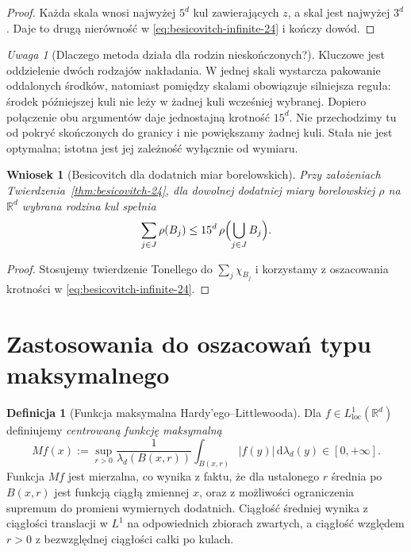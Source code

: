 \documentclass[11pt,a4paper,oneside]{book}
\numberwithin{equation}{chapter}
\theoremstyle{plain}
\newtheorem{wniosek}[twierdzenie]{Wniosek}
\theoremstyle{definition}
\newtheorem{definicja}[twierdzenie]{Definicja}
\theoremstyle{remark}
\newtheorem{uwaga}[twierdzenie]{Uwaga}
\begin{document}
\begin{proof}
Każda skala wnosi najwyżej $5^d$ kul
zawierających $z$, a skal jest najwyżej $3^d$.
Daje to drugą nierówność w
\eqref{eq:besicovitch-infinite-24} i kończy dowód.
\end{proof}

\begin{uwaga}[Dlaczego metoda działa dla rodzin nieskończonych?]
Kluczowe jest oddzielenie dwóch rodzajów nakładania.
W jednej skali wystarcza pakowanie oddalonych
środków, natomiast pomiędzy skalami obowiązuje
silniejsza reguła: środek późniejszej kuli nie leży
w żadnej kuli wcześniej wybranej. Dopiero
połączenie obu argumentów daje jednostajną
krotność $15^d$. Nie przechodzimy tu od pokryć
skończonych do granicy i nie powiększamy żadnej kuli.
Stała nie jest optymalna; istotna jest jej
zależność wyłącznie od wymiaru.
\end{uwaga}

\begin{wniosek}[Besicovitch dla dodatnich miar borelowskich]
\label{cor:besicovitch-measure-infinite-24}
Przy założeniach Twierdzenia~\ref{thm:besicovitch-24},
dla dowolnej dodatniej miary borelowskiej $\rho$
na $\mathbb R^d$ wybrana rodzina kul spełnia
\[
 \sum_{j\in J}\rho(B_j)
 \le15^d\,\rho\Bigl(\bigcup_{j\in J}B_j\Bigr).
\]
\end{wniosek}
\begin{proof}
Stosujemy twierdzenie Tonellego do
$\sum_j\chi_{B_j}$ i korzystamy z oszacowania
krotności w \eqref{eq:besicovitch-infinite-24}.
\end{proof}

\section{Zastosowania do oszacowań typu maksymalnego}
\begin{definicja}[Funkcja maksymalna Hardy'ego--Littlewooda]
\label{def:HL-max-24}
Dla $f\in L^1_{\mathrm{loc}}(\mathbb R^d)$ definiujemy
\emph{centrowaną funkcję maksymalną}
\[
 Mf(x):=\sup_{r>0}\frac1{\lambda_d(B(x,r))}
 \int_{B(x,r)}|f(y)|\,\mathrm d\lambda_d(y)
 \in[0,+\infty].
\]
Funkcja $Mf$ jest mierzalna, co wynika z faktu, że dla
ustalonego $r$ średnia po $B(x,r)$ jest funkcją ciągłą
zmiennej $x$, oraz z możliwości ograniczenia supremum
do promieni wymiernych dodatnich. Ciągłość średniej wynika
z ciągłości translacji w $L^1$ na odpowiednich zbiorach
zwartych, a ciągłość względem $r>0$ z bezwzględnej
ciągłości całki po kulach.
\end{definicja}
\end{document}
